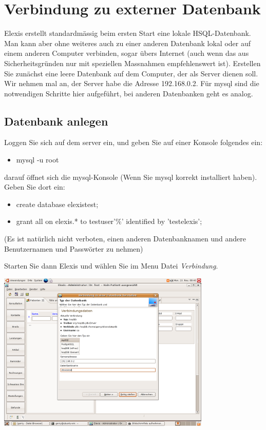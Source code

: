 \section{Verbindung zu externer Datenbank}
Elexis erstellt standardmässig beim ersten Start eine lokale HSQL-Datenbank. Man kann aber ohne weiteres auch zu einer anderen Datenbank lokal oder auf einem anderen Computer verbinden, sogar übers Internet (auch wenn das aus Sicherheitsgründen nur mit speziellen Massnahmen empfehlenswert ist).
Erstellen Sie zunächst eine leere Datenbank auf dem Computer, der als Server dienen soll. Wir nehmen mal an, der Server habe die Adresse 192.168.0.2. Für mysql sind die notwendigen Schritte hier aufgeführt, bei anderen Datenbanken geht es analog.

\subsection{Datenbank anlegen}
Loggen Sie sich auf dem server ein, und geben Sie auf einer Konsole folgendes ein:
\begin{itemize}
 \item mysql -u root
\end{itemize}

darauf öffnet sich die mysql-Konsole (Wenn Sie mysql korrekt installiert haben).
Geben Sie dort ein:
\begin{itemize}
 \item create database elexistest;
\item grant all on elexis.* to testuser\@'\%' identified by 'testelexis';
\end{itemize}




(Es ist natürlich nicht verboten, einen anderen Datenbanknamen und andere Benutzernamen und Passwörter zu nehmen)

Starten Sie dann Elexis und wählen Sie im Menu Datei  \textit{Verbindung}.

\includegraphics[width=4in]{images/verbindung1.png}

